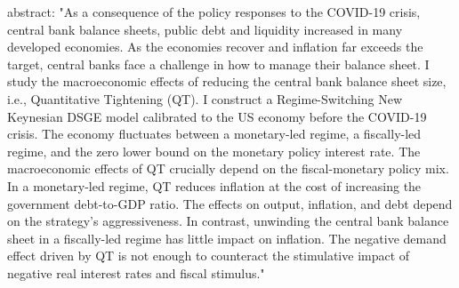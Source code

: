 abstract: "As a consequence of the policy responses to the COVID-19 crisis, central bank balance sheets, public debt and liquidity increased in many developed economies. As the economies recover and inflation far exceeds the target, central banks face a challenge in how to manage their balance sheet. I study the macroeconomic effects of reducing the central bank balance sheet size, i.e., Quantitative Tightening (QT). I construct a Regime-Switching New Keynesian DSGE model calibrated to the US economy before the COVID-19 crisis. The economy fluctuates between a monetary-led regime, a fiscally-led regime, and the zero lower bound on the monetary policy interest rate. The macroeconomic effects of QT crucially depend on the fiscal-monetary policy mix. In a monetary-led regime, QT reduces inflation at the cost of increasing the government debt-to-GDP ratio. The effects on output, inflation, and debt depend on the strategy’s aggressiveness. In contrast, unwinding the central bank balance sheet in a fiscally-led regime has little impact on inflation. The negative demand effect driven by QT is not enough to counteract the stimulative impact of negative real interest rates and fiscal stimulus."